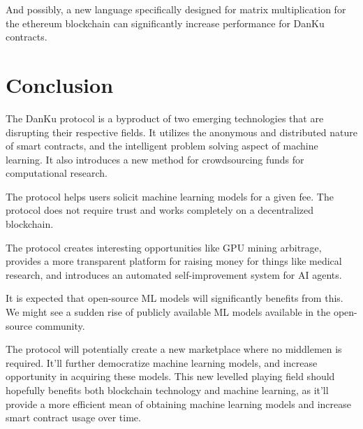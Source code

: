 \documentclass{article}
\begin{document}
And possibly, a new language specifically designed for matrix multiplication for the ethereum blockchain can significantly increase performance for DanKu contracts.

\section{Conclusion}

The DanKu protocol is a byproduct of two emerging technologies that are disrupting their respective fields. It utilizes the anonymous and distributed nature of smart contracts, and the intelligent problem solving aspect of machine learning. It also introduces a new method for crowdsourcing funds for computational research.

The protocol helps users solicit machine learning models for a given fee. The protocol does not require trust and works completely on a decentralized blockchain.

The protocol creates interesting opportunities like GPU mining arbitrage, provides a more transparent platform for raising money for things like medical research, and introduces an automated self-improvement system for AI agents.

It is expected that open-source ML models will significantly benefits from this. We might see a sudden rise of publicly available ML models available in the open-source community.

The protocol will potentially create a new marketplace where no middlemen is required. It’ll further democratize machine learning models, and increase opportunity in acquiring these models. This new levelled playing field should hopefully benefits both blockchain technology and machine learning, as it’ll provide a more efficient mean of obtaining machine learning models and increase smart contract usage over time.



\end{document}
